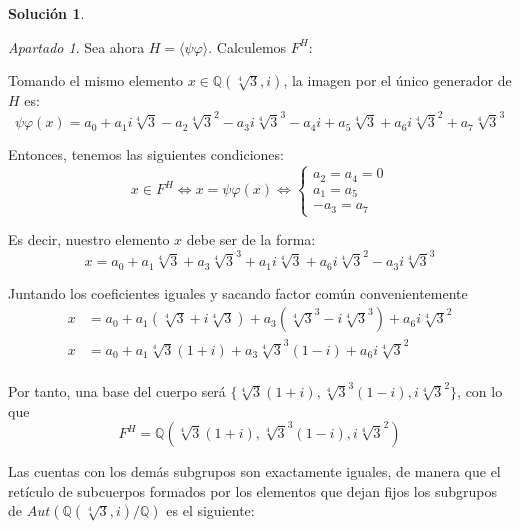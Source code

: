 \documentclass[a4paper, 11pt]{article}
\theoremstyle{definition}
\newtheorem*{solucion}{Solución}
\theoremstyle{remark}
\newtheorem{apartado}{Apartado}[ejercicio]
\begin{document}
\begin{solucion}
\begin{apartado}
          Sea ahora $H=\langle \psi\varphi \rangle$. Calculemos $F^H$:

          Tomando el mismo elemento $x \in \mathbb{Q}(\sqrt[4]{3},i)$, la imagen por el único generador de $H$ es:
          \[
          \psi\varphi(x) = a_0 + a_1 i\sqrt[4]{3} - a_2 \sqrt[4]{3}^2 - a_3 i\sqrt[4]{3}^3 - a_4 i + a_5 \sqrt[4]{3} + a_6 i \sqrt[4]{3}^2 + a_7 \sqrt[4]{3}^3
          \]

          Entonces, tenemos las siguientes condiciones:
          \[
          x \in F^H \iff x = \psi\varphi(x) \iff
          \begin{cases}
              a_2 = a_4 = 0\\
              a_1 = a_5\\
              -a_3 = a_7
          \end{cases}
          \]

          Es decir, nuestro elemento $x$ debe ser de la forma:
          \[
            x = a_0 + a_1 \sqrt[4]{3} + a_3 \sqrt[4]{3}^3 + a_1 i \sqrt[4]{3} + a_6 i \sqrt[4]{3}^2 - a_3 i \sqrt[4]{3}^3
          \]

          Juntando los coeficientes iguales y sacando factor común convenientemente
          \begin{align*}
            x &= a_0 + a_1(\sqrt[4]{3} + i \sqrt[4]{3}) + a_3(\sqrt[4]{3}^3 - i \sqrt[4]{3}^3) + a_6 i \sqrt[4]{3}^2\\
            x &= a_0 + a_1\sqrt[4]{3}(1 + i) + a_3\sqrt[4]{3}^3(1 - i) + a_6 i \sqrt[4]{3}^2\\
          \end{align*}

          Por tanto, una base del cuerpo será $\{\sqrt[4]{3}(1 + i), \sqrt[4]{3}^3(1 - i), i\sqrt[4]{3}^2\}$, con lo que
          \[
            F^H = \mathbb{Q}(\sqrt[4]{3}(1 + i), \sqrt[4]{3}^3(1 - i), i\sqrt[4]{3}^2)
          \]

          Las cuentas con los demás subgrupos son exactamente iguales, de manera que el retículo de subcuerpos formados por los elementos que dejan fijos los subgrupos de $Aut(\mathbb{Q}(\sqrt[4]{3},i)/\mathbb{Q})$ es el siguiente:

          \vspace{1 cm}

          \centering
\end{apartado}
\end{solucion}
\end{document}
